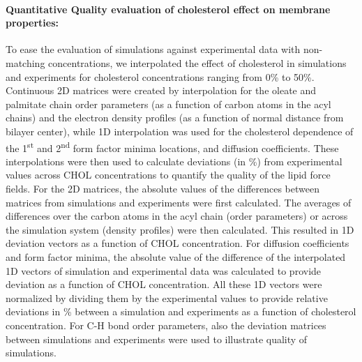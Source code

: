 \documentclass[journal=jctcce]{achemso}
\begin{document}
\paragraph{Quantitative Quality evaluation of cholesterol effect on membrane properties:} To ease the evaluation of simulations against experimental data with non-matching concentrations, we interpolated the effect of cholesterol in simulations and experiments for cholesterol concentrations ranging from 0\% to 50\%.
Continuous 2D matrices were created by interpolation for the oleate and palmitate chain order parameters (as a function of carbon atoms in the acyl chains) and the electron density profiles (as a function of normal distance from bilayer center), while 1D interpolation was used for the cholesterol dependence of the 1\textsuperscript{st} and 2\textsuperscript{nd} form factor minima locations, and diffusion coefficients. These interpolations were then used to calculate deviations (in \%) from experimental values across CHOL concentrations to quantify the quality of the lipid force fields.  For the 2D matrices, the absolute values of the differences between matrices from simulations and experiments were first calculated. The averages of differences over the carbon atoms in the acyl chain (order parameters) or across the simulation system (density profiles) were then calculated. This resulted in 1D deviation vectors as a function of CHOL concentration. For diffusion coefficients and form factor minima, the absolute value of the difference of the interpolated 1D vectors of simulation and experimental data was calculated to provide deviation as a function of CHOL concentration. All these 1D vectors were normalized by dividing them by the experimental values to provide relative deviations in \% between a simulation and experiments as a function of cholesterol concentration. For C-H bond order parameters, also the deviation matrices between simulations and experiments were used to illustrate quality of simulations.
\end{document}
